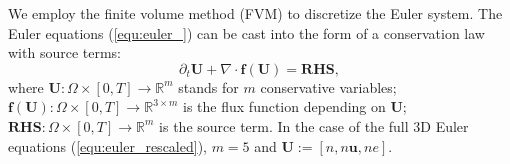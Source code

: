 \documentclass{article}
\begin{document}
We employ the finite volume method (FVM) to discretize the Euler system. The Euler
equations (\ref{equ:euler_}) can be cast into the form of a conservation law with source
terms:
\begin{equation} \label{equ:euler_conservation}
    \partial_t \mathbf{U} + \nabla \cdot \mathbf{f}(\mathbf{U}) = \mathbf{RHS},
\end{equation}
where $\mathbf{U} : \Omega \times [0,T] \rightarrow \mathbb{R}^m$ stands for $m$
conservative variables;
$\mathbf{f}(\mathbf{U}) : \Omega \times [0,T] \rightarrow \mathbb{R}^{3 \times m}$ is the flux
function depending on $\mathbf{U}$; $\mathbf{RHS} : \Omega \times [0,T] \rightarrow \mathbb{R}^m$ is the source
term. In the case of the full 3D Euler equations (\ref{equ:euler_rescaled}), $m = 5$ and
$\mathbf{U} := [n, n\mathbf{u}, ne]$.
\end{document}
